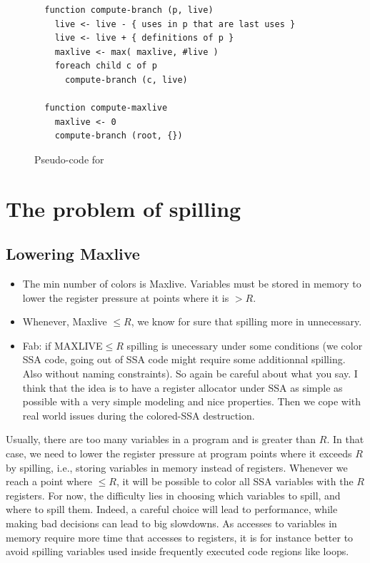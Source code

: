 {\begin{figure}[ht]
  \begin{verbatim}
  function compute-branch (p, live)
    live <- live - { uses in p that are last uses }
    live <- live + { definitions of p }
    maxlive <- max( maxlive, #live )
    foreach child c of p
      compute-branch (c, live)

  function compute-maxlive
    maxlive <- 0
    compute-branch (root, {})
  \end{verbatim}
  \caption{Pseudo-code for \maxlive}
  \label{code:compute-maxlive}
\end{figure}





\section{The problem of spilling}
\subsection{Lowering Maxlive}

{\sl
\begin{itemize}
  \item The min number of colors is Maxlive. Variables must be stored in memory 
    to lower the register pressure at points where it is $>R$.
  \item Whenever, Maxlive $\leq R$, we know for sure that spilling more in 
    unnecessary.
  \item Fab: if MAXLIVE$\leq R$ spilling is unecessary under some conditions (we color SSA code, going out of SSA code might require some additionnal spilling. Also without naming constraints). So again be careful about what you say. I think that the idea is to have a register allocator under SSA as simple as possible with a very simple modeling and nice properties. Then we cope with real world issues during the colored-SSA destruction.
\end{itemize}
}

Usually, there are too many variables in a program and \maxlive is greater than 
$R$. In that case, we need to lower the register pressure at program points 
where it exceeds $R$ by spilling, i.e., storing variables in memory instead of 
registers. Whenever we reach a point where \maxlive $\leq R$, it will be 
possible to color all SSA variables with the $R$ registers. For now, the 
difficulty lies in choosing which variables to spill, and where to spill them. 
Indeed, a careful choice will lead to performance, while making bad decisions 
can lead to big slowdowns. As accesses to variables in memory require more time 
that accesses to registers, it is for instance better to avoid spilling 
variables used inside frequently executed code regions like loops.

}

